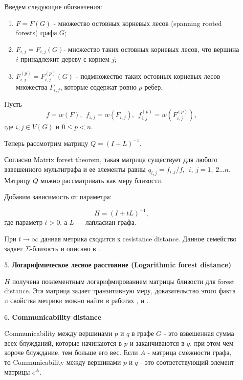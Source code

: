 \begin{itemize}
Введем следующие обозначения: 

\begin{enumerate}
\item $F = F(G)$ - множество остовных корневых лесов (spanning rooted forests) графа $G$; 
\item $F_{i,j} = F_{i,j}(G)$- множество таких остовных корневых лесов, что вершина $i$ принадлежит дереву с корнем $j$; 
\item $F_{i,j}^{(p)} = F_{i,j}^{(p)}(G)$ - подмножество таких остовных корневых лесов множества $F_{i,j}$, которые содержат ровно $p$ ребер.
\end{enumerate}

Пусть 
$$f = w(F),\ \  f_{i,j} = w(F_{i,j}),\ \  f_{i,j}^{(p)} = w(F_{i,j}^{(p)}),$$ 
где $i,j \in V(G)$ и $0 \le p < n$.

Теперь рассмотрим матрицу $Q = (I + L)^{-1}$.

Согласно Matrix forest theorem, такая матрица существует для любого взвешенного мультиграфа и ее элементы равны $q_{i,j} = f_{i,j}/f,\ \ i,\ j = 1,\ 2\ldots n$. Матрицу $Q$ можно рассматривать как меру близости. 

Добавим зависимость от параметра:

\begin{equation}
H = (I + tL) ^{-1}, 
\end{equation} 
где параметр $t > 0$, а $L$ --- лапласиан графа.

При $t \rightarrow \infty$ данная метрика сходится к resistance distance. Данное семейство задает $\Sigma$-близость и описано в \cite{chebotarev2011class}.

\item[5.] \textbf{Логарифмическое лесное расстояние (Logarithmic forest distance)}

$H$ получена поэлементным логарифмированием матрицы близости для forest distance. Эта матрица задает транзитивную меру, доказательство этого факта и свойства метрики можно найти в работах \cite{chebotarev2011bottleneck}, \cite{chebotarev2002forest} и \cite{chebotarev2011class}.

\item[6.] \textbf{Communicability distance}

Communicability между вершинами $p$ и $q$ в графе $G$ - это взвешенная сумма всех блужданий, которые начинаются в $p$ и заканчиваются в $q$, при этом чем короче блуждание, тем больше его вес. Если $A$ - матрица смежности графа, то Communicability между вершинами $p$ и $q$ - это соответствующий элемент матрицы $e^{A}$. 


\end{itemize}
